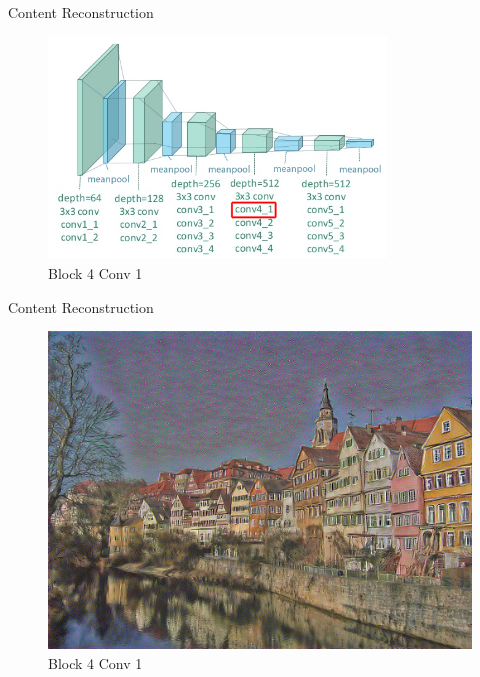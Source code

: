\documentclass{beamer}
\begin{document}
\begin{frame}{Content Reconstruction}
\begin{figure}[ht]
\centering
\includegraphics[width=0.8\textwidth]{img/vgg19/content/block4_conv1}
\caption*{Block 4 Conv 1}
\end{figure}
\end{frame}
\begin{frame}{Content Reconstruction}
\begin{figure}[ht]
\centering
\includegraphics[width=.8\textwidth]{img/content/block4_conv1}
\caption*{Block 4 Conv 1}
\end{figure}
\end{frame}
\end{document}
